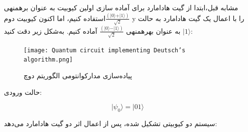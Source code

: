 \documentclass{book}
\begin{document}
مشابه قبل،‌ابتدا از گیت هادامارد برای آماده سازی اولین کیوبیت به عنوان برهمنهی $\frac{(\vert 0 \rangle + \vert 1 \rangle)}{\sqrt{2}}$استفاده کنیم، اما اکنون کیوبیت دوم y را با اعمال یک گیت هادامارد به حالت $\vert 1 \rangle$ به عنوان بهرهمنهی $\frac{(\vert 0 \rangle - \vert 1 \rangle)}{\sqrt{2}}$ آماده کنیم. به‌شکل زیر دقت کنید:



\begin{figure}[ht]
	\centering
	\texttt{[image: Quantum circuit implementing Deutsch’s algorithm.png]}
	\caption{پیاده‌سازی مدارکوانتومی‌ الگوریتم دوچ}
\end{figure}
حالت ورودی:\\
\begin{center}
	\begin{equation}\label{zero state deutsch}
		\vert\psi_{0}\rangle = \vert01\rangle
	\end{equation}
\end{center}

سیستم دو کیوبیتی تشکیل شده،‌ پس از اعمال اثر دو گیت هادامارد می‌دهد:\\
\end{document}
